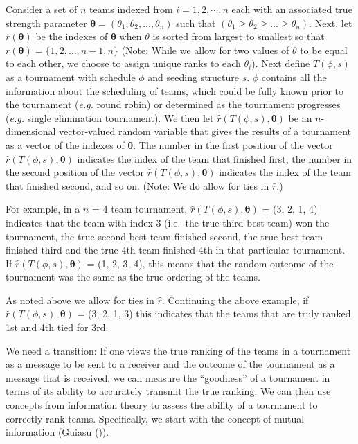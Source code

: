 \documentclass[
  12pt,
]{article}
\begin{document}
Consider a set of \(n\) teams indexed from \(i = 1, 2, \cdots, n\) each
with an associated true strength parameter
\(\boldsymbol{\theta} = (\theta_1, \theta_2, \ldots, \theta_n)\) such
that \((\theta_1 \ge \theta_2 \ge \ldots \ge \theta_n)\). Next, let
\(r(\boldsymbol{\theta})\) be the indexes of \(\boldsymbol{\theta}\)
when \(\theta\) is sorted from largest to smallest so that
\(r(\boldsymbol{\theta}) = \{1, 2, \ldots, n-1, n\}\) (Note: While we
allow for two values of \(\theta\) to be equal to each other, we choose
to assign unique ranks to each \(\theta_i\)). Next define \(T(\phi, s)\)
as a tournament with schedule \(\phi\) and seeding structure \(s\).
\(\phi\) contains all the information about the scheduling of teams,
which could be fully known prior to the tournament (\emph{e.g.} round
robin) or determined as the tournament progresses (\emph{e.g.} single
elimination tournament). We then let
\(\hat{r}(T(\phi, s),\boldsymbol{\theta})\) be an \(n\)-dimensional
vector-valued random variable that gives the results of a tournament as
a vector of the indexes of \(\boldsymbol{\theta}\). The number in the
first position of the vector \(\hat{r}(T(\phi, s),\boldsymbol{\theta})\)
indicates the index of the team that finished first, the number in the
second position of the vector
\(\hat{r}(T(\phi, s),\boldsymbol{\theta})\) indicates the index of the
team that finished second, and so on. (Note: We do allow for ties in
\(\hat{r}\).)

For example, in a \(n\) = 4 team tournament,
\(\hat{r}(T(\phi, s),\boldsymbol{\theta})\) = (3, 2, 1, 4) indicates
that the team with index 3 (i.e.~the true third best team) won the
tournament, the true second best team finished second, the true best
team finished third and the true 4th team finished 4th in that
particular tournament. If \(\hat{r}(T(\phi, s),\boldsymbol{\theta})\) =
(1, 2, 3, 4), this means that the random outcome of the tournament was
the same as the true ordering of the teams.

As noted above we allow for ties in \(\hat{r}\). Continuing the above
example, if \(\hat{r}(T(\phi, s),\boldsymbol{\theta})\) = (3, 2, 1, 3)
this indicates that the teams that are truly ranked 1st and 4th tied for
3rd.

We need a transition: If one views the true ranking of the teams in a
tournament as a message to be sent to a receiver and the outcome of the
tournament as a message that is received, we can measure the
``goodness'' of a tournament in terms of its ability to accurately
transmit the true ranking. We can then use concepts from information
theory to assess the ability of a tournament to correctly rank teams.
Specifically, we start with the concept of mutual information (Guiasu
()).
\end{document}
